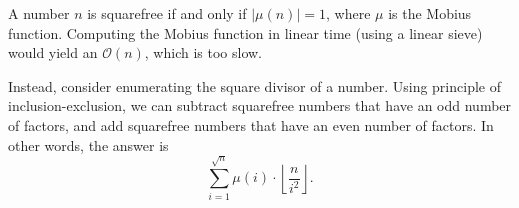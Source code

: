 \documentclass{article}
\begin{document}
A number $n$ is squarefree if and only if $\lvert \mu(n)\rvert=1$, where $\mu$ is the Mobius function. Computing the Mobius function in linear time (using a linear sieve) would yield an $\mathcal{O}(n)$, which is too slow. 

Instead, consider enumerating the square divisor of a number. Using principle of inclusion-exclusion, we can subtract squarefree numbers that have an odd number of factors, and add squarefree numbers that have an even number of factors. In other words, the answer is $$\sum_{i=1}^{\sqrt{n}}\mu(i)\cdot \left\lfloor\frac{n}{i^2}\right\rfloor.$$
\end{document}
